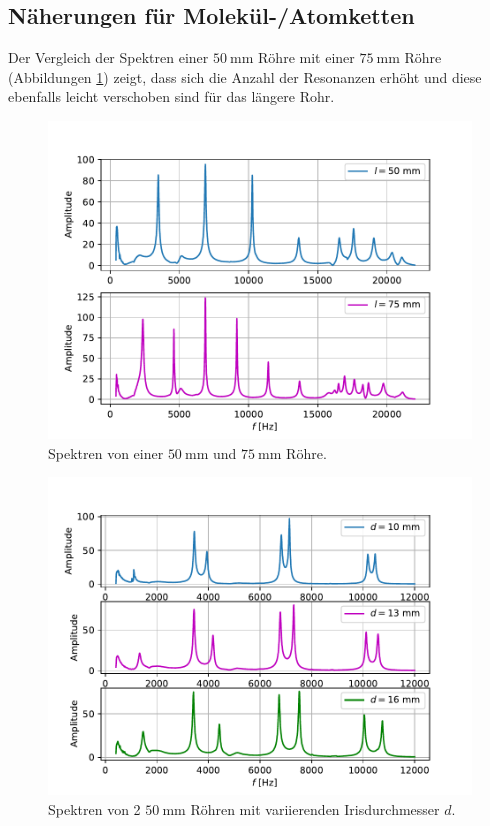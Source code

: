 \subsection{Näherungen für Molekül-/Atomketten}
Der Vergleich der Spektren einer $\SI{50}{\milli\meter}$ Röhre mit einer $\SI{75}{\milli\meter}$ Röhre (Abbildungen \ref{fig:plot10}) zeigt, dass sich die Anzahl der Resonanzen erhöht und
diese ebenfalls leicht verschoben sind für das längere Rohr.
\begin{figure}
  \centering
  \includegraphics[scale=0.5]{Messwerte/plot10.pdf}
  \caption{Spektren von einer $\SI{50}{\milli\meter}$ und $\SI{75}{\milli\meter}$ Röhre.}
  \label{fig:plot10}
\end{figure}
\begin{figure}
  \centering
  \includegraphics[scale=0.5]{Messwerte/plot11.pdf}
  \caption{Spektren von 2 $\SI{50}{\milli\meter}$ Röhren mit variierenden Irisdurchmesser $d$.}
  \label{fig:plot11}
\end{figure}
